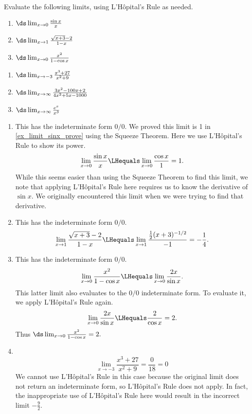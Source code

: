 \begin{example}\label{ex_lhr1}
Evaluate the following limits, using L'H\^opital's Rule as needed.\\
\begin{minipage}[t]{.5\textwidth}
\begin{enumerate}
\item		$\ds \lim_{x\to0}\frac{\sin x}x$
\item		$\ds \lim_{x\to 1}\frac{\sqrt{x+3}-2}{1-x}$
\item		$\ds \lim_{x\to0}\frac{x^2}{1-\cos x}$
\end{enumerate}
\end{minipage}%
\begin{minipage}[t]{.5\textwidth}
\begin{enumerate}\addtocounter{enumi}{3}
	\item	$\ds\lim_{x\to-3}\frac{x^3+27}{x^2+9}$
	\item	$\ds\lim_{x\to\infty}\frac{3x^2-100x+2}{4x^2+5x-1000}$
	\item	$\ds\lim_{x\to\infty}\frac{e^x}{x^3}$
\end{enumerate}
\end{minipage}
\solution
\begin{enumerate}
	\item	This has the indeterminate form $0/0$. We proved this limit is 1 in \autoref{ex_limit_sinx_prove} using the Squeeze Theorem. Here we use L'H\^opital's Rule to show its power.
\[\lim_{x\to0}\frac{\sin x}x \LHequals \lim_{x\to0} \frac{\cos x}{1}=1.\]
While this seems easier than using the Squeeze Theorem to find this limit, we note that applying L'H\^opital's Rule here requires us to know the derivative of $\sin x$. We originally encountered this limit when we were trying to find that derivative.

	\item	This has the indeterminate form $0/0$.
\[\lim_{x\to 1}\frac{\sqrt{x+3}-2}{1-x} 	 \LHequals \lim_{x \to 1} \frac{\frac12(x+3)^{-1/2}}{-1} =-\frac 14.\]

	\item	This has the indeterminate form $0/0$.
\[\lim_{x\to 0}\frac{x^2}{1-\cos x}  \LHequals  \lim_{x\to 0} \frac{2x}{\sin x}.\]
This latter limit also evaluates to the $0/0$ indeterminate form. To evaluate it, we apply L'H\^opital's Rule again.
\[
 \lim_{x\to 0} \frac{2x}{\sin x}
 \LHequals \frac{2}{\cos x} = 2 .
\]
Thus $\ds \lim_{x\to0}\frac{x^2}{1-\cos x}=2.$

	\item \mbox{}\\[-2\baselineskip]
\[\lim_{x\to-3}\frac{x^3+27}{x^2+9} =\frac 0{18}=0\]
We cannot use L'H\^opital's Rule in this case because the original limit does not return an indeterminate form, so L'H\^opital's Rule does not apply. In fact, the inappropriate use of L'H\^opital's Rule here would result in the incorrect limit $-\frac92$.


\end{enumerate}
\end{example}
